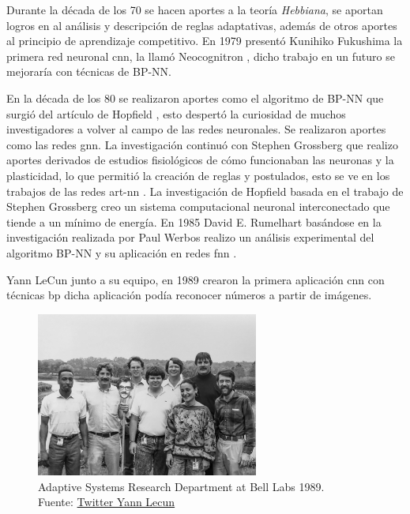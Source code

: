Durante la década de los 70 se hacen aportes a la teoría \textit{Hebbiana}, se aportan logros en al análisis y descripción de reglas adaptativas, además de otros aportes al principio de aprendizaje competitivo.
En 1979 presentó {Kunihiko Fukushima} la primera red neuronal \acrshort{cnn}, la llamó Neocognitron \cite{fukushima1979neural}, dicho trabajo en un futuro se mejoraría con técnicas de \gls{BP-NN}.

En la década de los 80 se realizaron aportes como el algoritmo de \gls{BP-NN} que surgió del artículo de {Hopfield} \cite{hopfield1982neural}, esto despertó la curiosidad de muchos investigadores a volver al campo de las redes neuronales.
Se realizaron aportes como las redes \acrshort{gnn}.
La investigación continuó con {Stephen Grossberg} que realizo aportes derivados de estudios fisiológicos de cómo funcionaban las neuronas y la plasticidad, lo que permitió la creación de reglas y postulados, esto se ve en los trabajos de las redes \acrshort{art-nn} \cite{grossberg1987competitive}.
La investigación de {Hopfield} basada en el trabajo de {Stephen Grossberg} creo un sistema computacional neuronal interconectado que tiende a un mínimo de energía.
En 1985 {David E. Rumelhart} basándose en la investigación realizada por {Paul Werbos} \cite{etde_5080493} realizo un análisis experimental del algoritmo \gls{BP-NN} y su aplicación en redes \acrshort{fnn} \cite{rumelhart1985learning}.

{Yann LeCun} junto a su equipo, en 1989 crearon la primera aplicación \acrshort{cnn} con técnicas \acrshort{bp} dicha aplicación podía reconocer números a partir de imágenes.

\begin{figure}[H]
  \centering
  \includegraphics[width=0.65\textwidth]{figures/yann-lecun - EyIwmEDW8AIQs1C.jpeg}
  \caption{Adaptive Systems Research Department at Bell Labs 1989.\\Fuente: \href{https://twitter.com/ylecun/status/1378718317695934465}{Twitter Yann Lecun}}
  \label{fig:adaptive-systems-research-department-at-bell-labs}
\end{figure}


